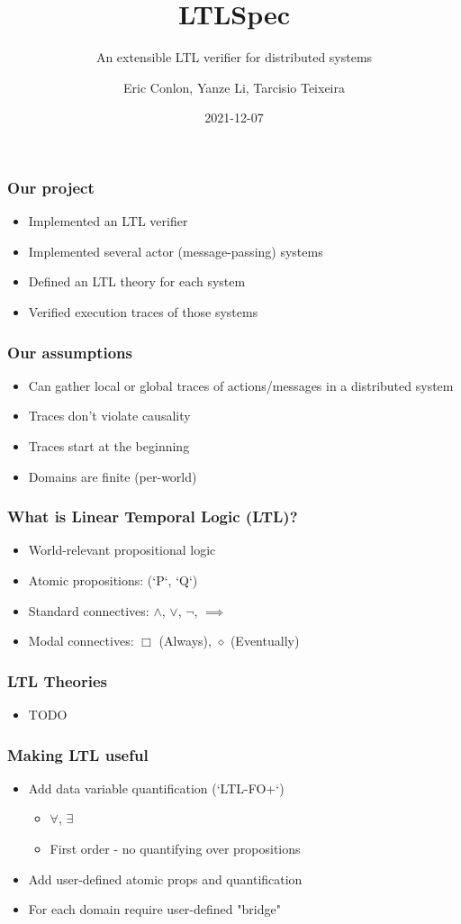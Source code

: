 \documentclass{beamer}
\title{LTLSpec}
\subtitle{An extensible LTL verifier for distributed systems}
\author{Eric Conlon, Yanze Li, Tarcisio Teixeira}
\date{2021-12-07}
\begin{document}
\frame{\titlepage}

\begin{frame}
\frametitle{Our project}
\begin{itemize}
  \item Implemented an LTL verifier
  \item Implemented several actor (message-passing) systems
  \item Defined an LTL theory for each system
  \item Verified execution traces of those systems
\end{itemize}
\end{frame}

\begin{frame}
\frametitle{Our assumptions}
\begin{itemize}
  \item Can gather local or global traces of actions/messages in a distributed system
  \item Traces don't violate causality
  \item Traces start at the beginning
  \item Domains are finite (per-world)
\end{itemize}
\end{frame}


\begin{frame}
\frametitle{What is Linear Temporal Logic (LTL)?}
\begin{itemize}
  \item World-relevant propositional logic
  \item Atomic propositions: (`P`, `Q`)
  \item Standard connectives: $\land$, $\lor$, $\neg$, $\implies$
  \item Modal connectives: $\Box$ (Always), $\diamond$ (Eventually)
\end{itemize}
\end{frame}

\begin{frame}
\frametitle{LTL Theories}
\begin{itemize}
  \item TODO
\end{itemize}
\end{frame}

\begin{frame}
\frametitle{Making LTL useful}
\begin{itemize}
  \item Add data variable quantification (`LTL-FO+`)
  \begin{itemize}
    \item $\forall$, $\exists$
    \item First order - no quantifying over propositions
  \end{itemize}
  \item Add user-defined atomic props and quantification
  \item For each domain require user-defined "bridge"
\end{itemize}
\end{frame}
\end{document}
